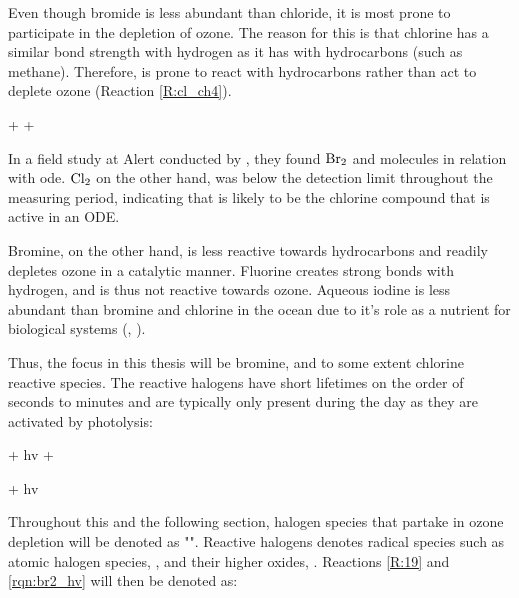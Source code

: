 \medskip

Even though bromide is less abundant than chloride, it is most prone to participate in the depletion of ozone. The reason for this is that chlorine has a similar bond strength with hydrogen as it has with hydrocarbons (such as methane). Therefore,  is prone to react with hydrocarbons rather than act to deplete ozone (Reaction \ref{R:cl_ch4}).

\begin{reaction}
     +  \rightarrow {} + 
    \label{R:cl_ch4}
\end{reaction}

In a field study at Alert conducted by \cite{Foster2001}, they found $\mathrm{Br_2}$ and  molecules in relation with \acrshort{ode}. $\mathrm{Cl_2}$ on the other hand, was below the detection limit throughout the measuring period, indicating that  is likely to be the chlorine compound that is active in an ODE.

\medskip

Bromine, on the other hand, is less reactive towards hydrocarbons and readily depletes ozone in a catalytic manner.  Fluorine creates strong bonds with hydrogen, and is thus not reactive towards ozone. Aqueous iodine is less abundant than bromine and chlorine in the ocean due to it's role as a nutrient for biological systems (\cite{FinlaysonPitts2010}, \cite{Simpson2015}). 

\medskip

Thus, the focus in this thesis will be bromine, and to some extent chlorine reactive species. The reactive halogens have short lifetimes on the order of seconds to minutes and are typically only present during the day as they are activated by photolysis:

\begin{reaction}
     + hv \rightarrow {} + 
    \label{R:19}
\end{reaction}

\begin{reaction}
     + hv 
    \label{rqn:br2_hv}
\end{reaction}

Throughout this and the following section, halogen species that partake in ozone depletion will be denoted as "". Reactive halogens denotes radical species such as atomic halogen species, , and their higher oxides, . Reactions \ref{R:19} and \ref{rqn:br2_hv} will then be denoted as: 

